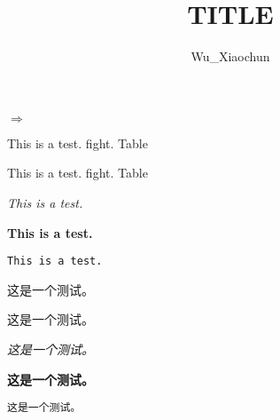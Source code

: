 ﻿\documentclass[11pt,a4paper,onecolumn]{article}
\title{TITLE}
\author{Wu_Xiaochun}
\date{}
\begin{document}
$\Rightarrow$

This is a test. fight. Table

\textsf{This is a test. fight. Table}

\textit{This is a test.}

\textbf{This is a test.}

\texttt{This is a test.}

这是一个测试。

\textsf{这是一个测试。}

\textit{这是一个测试。}

\textbf{这是一个测试。}

\texttt{这是一个测试。}
\end{document}
